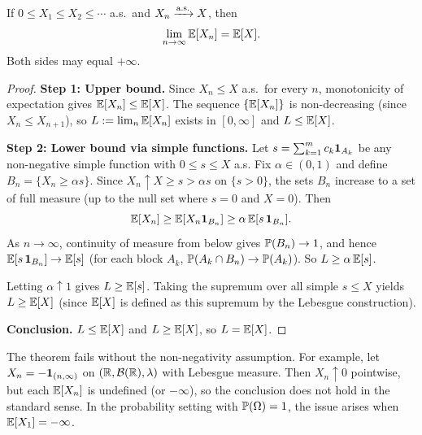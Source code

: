 \documentclass[11pt,a4paper]{article}
\begin{document}
\begin{keyresult}[title={Monotone Convergence Theorem}]
\begin{theorem}
\label{thm:mct}
If $0 \leq X_1 \leq X_2 \leq \cdots$ a.s.\ and
$X_n \xrightarrow{\text{a.s.}} X$, then
\begin{equation}
  \lim_{n \to \infty} \mathbb{E}[X_n] = \mathbb{E}[X].
  \label{eq:mct}
\end{equation}
Both sides may equal $+\infty$.
\end{theorem}
\end{keyresult}

\begin{proof}
\textbf{Step 1: Upper bound.}
Since $X_n \leq X$ a.s.\ for every $n$, monotonicity of
expectation gives $\mathbb{E}[X_n] \leq \mathbb{E}[X]$.  The sequence
$\{\mathbb{E}[X_n]\}$ is non-decreasing (since $X_n \leq X_{n+1}$), so
$L := \lim_n \mathbb{E}[X_n]$ exists in $[0, \infty]$ and
$L \leq \mathbb{E}[X]$.

\textbf{Step 2: Lower bound via simple functions.}
Let $s = \sum_{k=1}^m c_k \mathbf{1}_{A_k}$ be any non-negative
simple function with $0 \leq s \leq X$ a.s.  Fix
$\alpha \in (0,1)$ and define $B_n = \{X_n \geq \alpha s\}$.
Since $X_n \uparrow X \geq s > \alpha s$ on $\{s > 0\}$, the
sets $B_n$ increase to a set of full measure (up to the null set
where $s = 0$ and $X = 0$).  Then
\begin{equation}
  \mathbb{E}[X_n] \geq \mathbb{E}[X_n \mathbf{1}_{B_n}]
  \geq \alpha\, \mathbb{E}[s\, \mathbf{1}_{B_n}].
\end{equation}
As $n \to \infty$, continuity of measure from below gives
$\mathbb{P}(B_n) \to 1$, and hence
$\mathbb{E}[s\, \mathbf{1}_{B_n}] \to \mathbb{E}[s]$ (for each block $A_k$,
$\mathbb{P}(A_k \cap B_n) \to \mathbb{P}(A_k)$).  So
$L \geq \alpha\, \mathbb{E}[s]$.

Letting $\alpha \uparrow 1$ gives $L \geq \mathbb{E}[s]$.  Taking the
supremum over all simple $s \leq X$ yields $L \geq \mathbb{E}[X]$
(since $\mathbb{E}[X]$ is defined as this supremum by the Lebesgue
construction).

\textbf{Conclusion.}
$L \leq \mathbb{E}[X]$ and $L \geq \mathbb{E}[X]$, so $L = \mathbb{E}[X]$.
\end{proof}

\begin{remark}
\label{rem:mct_nonneg}
The theorem fails without the non-negativity assumption.  For
example, let $X_n = -\mathbf{1}_{(n, \infty)}$ on
$(\mathbb{R}, \mathcal{B}(\mathbb{R}), \lambda)$ with Lebesgue measure.  Then
$X_n \uparrow 0$ pointwise, but each $\mathbb{E}[X_n]$ is undefined
(or $-\infty$), so the conclusion does not hold in the standard
sense.  In the probability setting with $\mathbb{P}(\Omega) = 1$, the
issue arises when $\mathbb{E}[X_1] = -\infty$.
\end{remark}
\end{document}

